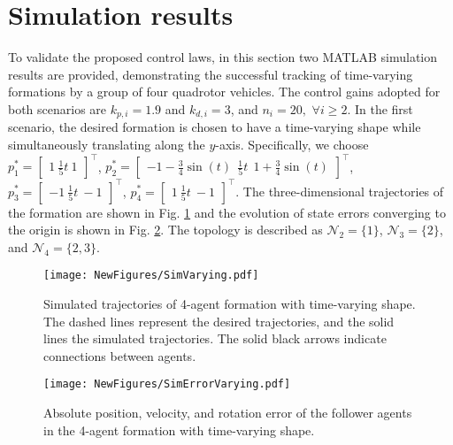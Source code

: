 \section{Simulation results} \label{sec:simulations}
To validate the proposed control laws, in this section two MATLAB simulation results are provided, demonstrating the successful tracking of time-varying formations by a group of four quadrotor vehicles. The control gains adopted for both scenarios are $k_{p,i}=1.9$ and $k_{d,i}=3$, and $n_i=20, $ $\forall i\ge 2$. In the first scenario, the desired formation is chosen to have a time-varying shape while simultaneously translating along the $y$-axis. Specifically, we choose $p_1^*{=}\begin{bmatrix} 1 ~ \frac{1}{5}t ~ 1\end{bmatrix}^\top$, $p_2^*{=}\begin{bmatrix} -1{-}\frac{3}{4}\sin(t) \ \ \frac{1}{5}t \ \ 1{+}\frac{3}{4}\sin(t) \end{bmatrix}^\top$, $p_3^*{=}\begin{bmatrix} {-}1 ~ \frac{1}{5}t 
 ~ {-}1\end{bmatrix}^\top$, $p_4^*{=}\begin{bmatrix} 1 ~ \frac{1}{5}t ~ {-}1\end{bmatrix}^\top$. The three-dimensional trajectories of the formation are shown in Fig. \ref{fig:simvarying} and the evolution of state errors converging to the origin is shown in Fig. \ref{fig:simerrvarying}. The topology is described as $\mathcal{N}_2 = \{1\}$, $\mathcal{N}_3 = \{2\}$, and $\mathcal{N}_4 = \{2, 3\}$.
\begin{figure}[p]
 	\centering
 	\texttt{[image: NewFigures/SimVarying.pdf]}
        \vspace{-0.4cm}
 	\caption{Simulated trajectories of 4-agent formation with time-varying shape. The dashed lines represent the desired trajectories, and the solid lines the simulated trajectories. The solid black arrows indicate connections between agents.}
 	\label{fig:simvarying}
\end{figure}
\begin{figure}%
	\centering
	\texttt{[image: NewFigures/SimErrorVarying.pdf]}
    \vspace{-0.4cm}
	\caption{Absolute position, velocity, and rotation error of the follower agents in the 4-agent formation with time-varying shape.}
	\label{fig:simerrvarying}
\end{figure}

